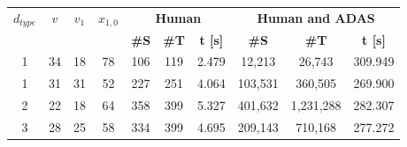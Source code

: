\vspace{1em}
\bgroup
\def\arraystretch{1.3}
\begin{table}[H]
\centering
\begin{tabular}{|c|c|c|c|c|c|c|c|c|c|}
\hline
\multicolumn{1}{|c|}{\multirow{2}{*}{$d_{type}$}} & \multicolumn{1}{c|}{\multirow{2}{*}{$v$}} & \multicolumn{1}{c|}{\multirow{2}{*}{$v_1$}} & \multicolumn{1}{c|}{\multirow{2}{*}{$x_{1,0}$}} & \multicolumn{3}{c|}{\textbf{Human}}                                                                             & \multicolumn{3}{c|}{\textbf{Human and ADAS}}                                                                    \\ \cline{5-10} 
\multicolumn{1}{|c|}{}                            & \multicolumn{1}{c|}{}                     & \multicolumn{1}{c|}{}                       & \multicolumn{1}{c|}{}                           & \multicolumn{1}{c|}{\textbf{\#S}} & \multicolumn{1}{c|}{\textbf{\#T}} & \multicolumn{1}{c|}{\textbf{t {[}s{]}}} & \multicolumn{1}{c|}{\textbf{\#S}} & \multicolumn{1}{c|}{\textbf{\#T}} & \multicolumn{1}{c|}{\textbf{t {[}s{]}}} \\ \hline \hline
1                                                 & 34                                        & 18                                          & 78                                              & 106                               & 119                               & 2.479                                   & 12,213                            & 26,743                            & 309.949                                 \\ \hline
1                                                 & 31                                        & 31                                          & 52                                              & 227                               & 251                               & 4.064                                   & 103,531                           & 360,505                           & 269.900                                 \\ \hline
2                                                 & 22                                        & 18                                          & 64                                              & 358                               & 399                               & 5.327                                   & 401,632                           & 1,231,288                         & 282.307                                 \\ \hline
3                                                 & 28                                        & 25                                          & 58                                              & 334                               & 399                               & 4.695                                   & 209,143                           & 710,168                           & 277.272                                 \\ \hline

\end{tabular}
\end{table}
